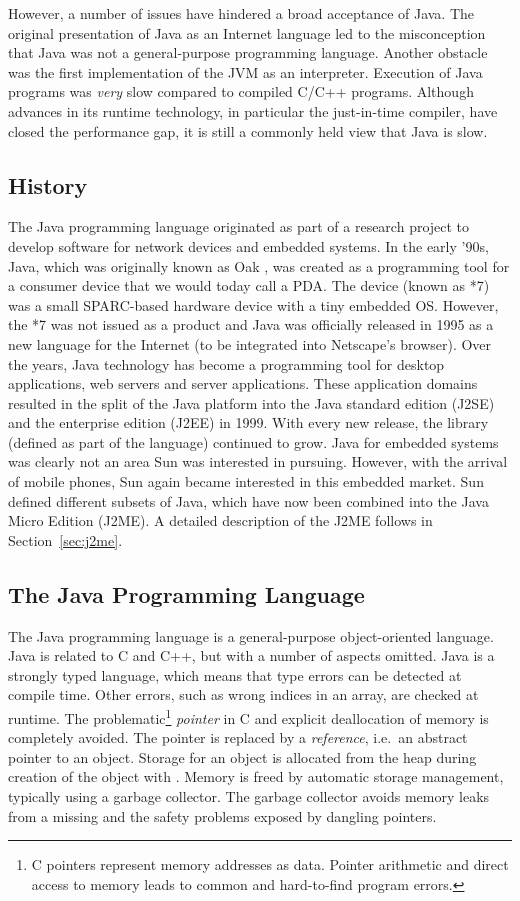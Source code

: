 However, a number of issues have hindered a broad acceptance of
Java. The original presentation of Java as an Internet language led
to the misconception that Java was not a general-purpose programming
language. Another obstacle was the first implementation of the JVM
as an interpreter. Execution of Java programs was \emph{very} slow
compared to compiled C/C++ programs. Although advances in its
runtime technology, in particular the just-in-time compiler, have
closed the performance gap, it is still a commonly held view that
Java is slow.

\subsection{History}

The Java programming language originated as part of a research
project to develop software for network devices and embedded
systems. In the early '90s, Java, which was originally known as Oak
\cite{java:oak, java:oak2}, was created as a programming tool for a
consumer device that we would today call a PDA. The device (known as
*7) was a small SPARC-based hardware device with a tiny embedded OS.
However, the *7 was not issued as a product and Java was officially
released in 1995 as a new language for the Internet (to be
integrated into Netscape's browser). Over the years, Java technology
has become a programming tool for desktop applications, web servers
and server applications. These application domains resulted in the
split of the Java platform into the Java standard edition (J2SE) and
the enterprise edition (J2EE) in 1999. With every new release, the
library (defined as part of the language) continued to grow. Java
for embedded systems was clearly not an area Sun was interested in
pursuing. However, with the arrival of mobile phones, Sun again
became interested in this embedded market. Sun defined different
subsets of Java, which have now been combined into the Java Micro
Edition (J2ME). A detailed description of the J2ME follows in
Section~\ref{sec:j2me}.


\subsection{The Java Programming Language}

The Java programming language is a general-purpose object-oriented
language. Java is related to C and C++, but with a number of aspects
omitted. Java is a strongly typed language, which means that type
errors can be detected at compile time. Other errors, such as wrong
indices in an array, are checked at runtime. The
problematic\footnote{C pointers represent memory addresses as data.
Pointer arithmetic and direct access to memory leads to common and
hard-to-find program errors.} \emph{pointer} in C and explicit
deallocation of memory is completely avoided. The pointer is
replaced by a \emph{reference}, i.e.\ an abstract pointer to an
object. Storage for an object is allocated from the heap during
creation of the object with . Memory is freed by automatic
storage management, typically using a garbage collector. The garbage
collector avoids memory leaks from a missing  and the
safety problems exposed by dangling pointers.

